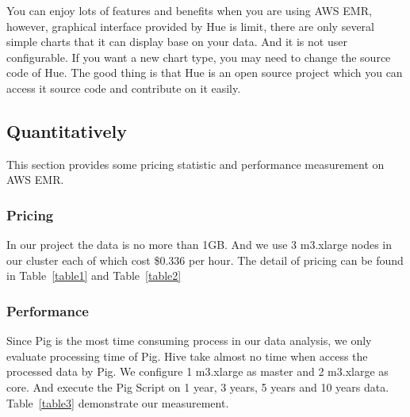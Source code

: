You can enjoy lots of features and benefits when you are using AWS EMR, however, graphical interface provided by Hue is limit, there are only several simple charts that it can display base on your data. And it is not user configurable. If you want a new chart type, you may need to change the source code of Hue. The good thing is that Hue is an open source project which you can access it source code and contribute on it easily.

\subsection{Quantitatively}
This section provides some pricing statistic and performance measurement on AWS EMR.

\subsubsection*{Pricing}
In our project the data is no more than 1GB. And we use 3 m3.xlarge nodes in our cluster each of which cost \$0.336 per hour. 
The detail of pricing can be found in Table~\ref{table1} and Table~\ref{table2}

\subsubsection*{Performance}
Since Pig is the most time consuming process in our data analysis, we only evaluate processing time of Pig. Hive take almost no time when access the processed data by Pig. We configure 1 m3.xlarge as master and 2 m3.xlarge as core. And execute the Pig Script on 1 year, 3 years, 5 years and 10 years data. 
Table~\ref{table3} demonstrate our measurement.


